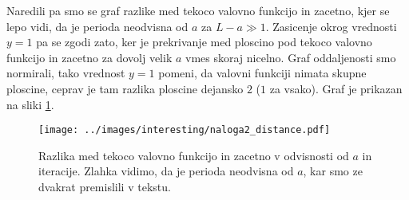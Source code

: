 \documentclass[11pt, a4paper]{article}
\begin{document}
    Naredili pa smo se graf razlike med tekoco valovno funkcijo in zacetno, kjer se lepo vidi, da je perioda neodvisna od $a$ za $L-a \gg 1$.
    Zasicenje okrog vrednosti $y=1$ pa se zgodi zato, ker je prekrivanje med ploscino pod tekoco valovno funkcijo in zacetno za dovolj velik $a$ vmes skoraj
    nicelno. Graf oddaljenosti smo normirali, tako vrednost $y=1$ pomeni, da valovni funkciji nimata skupne ploscine, ceprav je tam razlika ploscine dejansko $2$ ($1$ za vsako).
    Graf je prikazan na sliki \ref{fig:naloga2_lepa}.

    \begin{figure}
        \centering
        \texttt{[image: ../images/interesting/naloga2\_distance.pdf]}
        \caption{Razlika med tekoco valovno funkcijo in zacetno v odvisnosti od $a$ in iteracije. Zlahka vidimo, da je perioda neodvisna
        od $a$, kar smo ze dvakrat premislili v tekstu.}
        \label{fig:naloga2_lepa}
    \end{figure}
\end{document}
